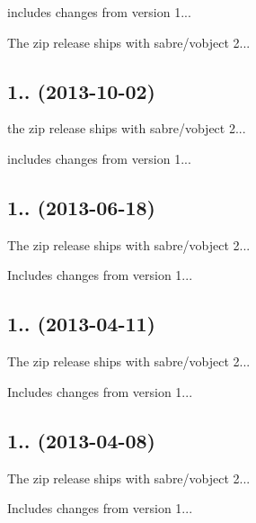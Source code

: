 \begin{DoxyItemize}
\item includes changes from version 1...
\item The zip release ships with sabre/vobject 2...
\end{DoxyItemize}

\subsection*{1.. (2013-\/10-\/02) }


\begin{DoxyItemize}
\item the zip release ships with sabre/vobject 2...
\item includes changes from version 1...
\end{DoxyItemize}

\subsection*{1.. (2013-\/06-\/18) }


\begin{DoxyItemize}
\item The zip release ships with sabre/vobject 2...
\item Includes changes from version 1...
\end{DoxyItemize}

\subsection*{1.. (2013-\/04-\/11) }


\begin{DoxyItemize}
\item The zip release ships with sabre/vobject 2...
\item Includes changes from version 1...
\end{DoxyItemize}

\subsection*{1.. (2013-\/04-\/08) }


\begin{DoxyItemize}
\item The zip release ships with sabre/vobject 2...
\item Includes changes from version 1...
\end{DoxyItemize}


